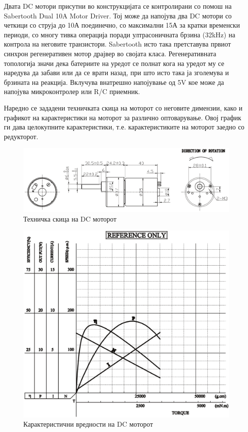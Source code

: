 \documentclass{article}
\begin{document}
Двата DC мотори присутни во конструкцијата се контролирани со помош на Sabertooth Dual 10A Motor Driver. Тој може да напојува два DC мотори со четкици со струја до 10А поединечно, со максимални 15А за кратки временски периоди, со многу тивка операција поради ултрасоничната брзина (32kHz) на контрола на неговите транзистори. Sabertooth исто така претставува првиот синхрон регенеративен мотор драјвер во својата класа. Регенеративната топологија значи дека батериите на уредот се полнат кога на уредот му се наредува да забави или да се врати назад, при што исто така ја зголемува и брзината на реакција. Вклучува внатрешно напојување од 5V кое може да напојува микроконтролер или R/C приемник. 

Наредно се зададени техничката скица на моторот со неговите димензии, како и графикот на карактеристики на моторот за различно оптоварување. Овој график ги дава целокупните карактеристики, т.е. карактеристиките на моторот заедно со редукторот.

\begin{figure}[H]
\includegraphics[width=0.75\linewidth]{motor_schematic.png}
\centering
\caption{Техничка скица на DC моторот}
\label{fig:motor_schematic.png}
\end{figure}

\begin{figure}[H]
\includegraphics[width=0.75\linewidth]{motor_graph.png}
\centering
\caption{Карактеристични вредности на DC моторот}
\label{fig:motor_graph.png}
\end{figure}
\end{document}
